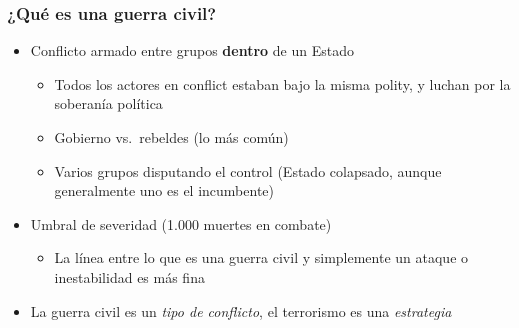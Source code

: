 \begin{frame}
\frametitle{¿Qué es una guerra civil?}
\centering

\begin{itemize}
  \item Conflicto armado entre grupos \textbf{dentro} de un Estado
  \begin{itemize}
    \item Todos los actores en conflict estaban bajo la misma polity, y luchan por la soberanía política
    \item<2-> Gobierno vs.~rebeldes (lo más común)
    \item<2-> Varios grupos disputando el control (Estado colapsado, aunque generalmente uno es el incumbente)
  \end{itemize}
  \item<3-> Umbral de severidad (1.000 muertes en combate)
  \begin{itemize}
      \item La línea entre lo que es una guerra civil y simplemente un ataque o inestabilidad es más fina
  \end{itemize}
  \item<3-> La guerra civil es un \textit{tipo de conflicto}, el terrorismo es una \textit{estrategia}
\end{itemize}

\end{frame}

